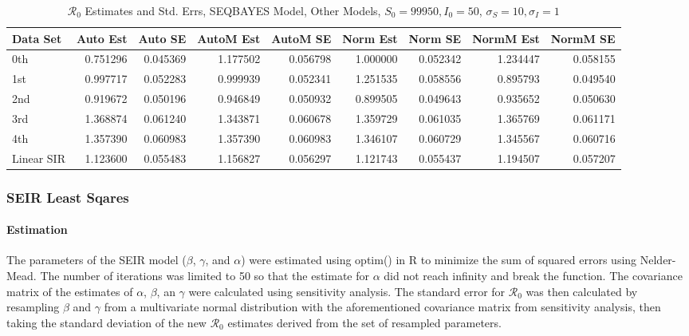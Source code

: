 \documentclass[12pt]{article}
\newcommand{\rr}{\ensuremath{\mathcal{R}_0}}
\begin{document}
\begin{table}[H]
	
	\caption{$\rr$ Estimates and Std. Errs, SEQBAYES Model,
		Other Models, $S_0 = 99950, I_0 = 50$, 
		$\sigma_S = 10, \sigma_I = 1$}
	\begin{footnotesize}
		\hskip -1cm
	\begin{tabular}{l|r|r|r|r|r|r|r|r}
		\hline
		Data Set & Auto Est & Auto SE & AutoM Est & AutoM SE & Norm Est & Norm SE & NormM Est & NormM SE\\
		\hline
		0th & 0.751296 & 0.045369 & 1.177502 & 0.056798 & 1.000000 & 0.052342 & 1.234447 & 0.058155\\
		\hline
		1st & 0.997717 & 0.052283 & 0.999939 & 0.052341 & 1.251535 & 0.058556 & 0.895793 & 0.049540\\
		\hline
		2nd & 0.919672 & 0.050196 & 0.946849 & 0.050932 & 0.899505 & 0.049643 & 0.935652 & 0.050630\\
		\hline
		3rd & 1.368874 & 0.061240 & 1.343871 & 0.060678 & 1.359729 & 0.061035 & 1.365769 & 0.061171\\
		\hline
		4th & 1.357390 & 0.060983 & 1.357390 & 0.060983 & 1.346107 & 0.060729 & 1.345567 & 0.060716\\
		\hline
		Linear SIR & 1.123600 & 0.055483 & 1.156827 & 0.056297 & 1.121743 & 0.055437 & 1.194507 & 0.057207\\
		\hline
	\end{tabular}
\end{footnotesize}
\end{table}

\subsubsection{SEIR Least Sqares}

\paragraph{Estimation}

The parameters of the SEIR model ($\beta$, $\gamma$, and $\alpha$) were estimated using optim() in R to minimize the sum of squared errors using Nelder-Mead. The number of iterations was limited to 50 so that the estimate for $\alpha$ did not reach infinity and break the function. The covariance matrix of the estimates of $\alpha$, $\beta$, an $\gamma$ were calculated using sensitivity analysis. The standard error for $\rr$ was then calculated by resampling $\beta$ and $\gamma$ from a multivariate normal distribution with the aforementioned covariance matrix from sensitivity analysis, then taking the standard deviation of the new $\rr$ estimates derived from the set of resampled parameters.
\end{document}
